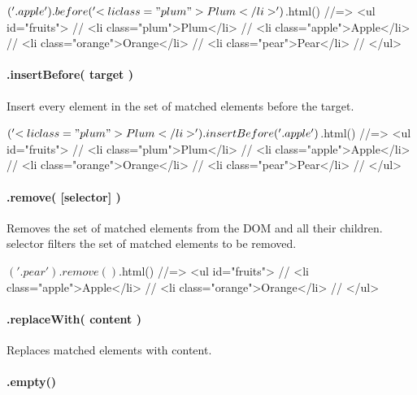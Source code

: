 \begin{DoxyCode}
$('.apple').before('<li class="plum">Plum</li>')
$.html()
//=>  <ul id="fruits">
//      <li class="plum">Plum</li>
//      <li class="apple">Apple</li>
//      <li class="orange">Orange</li>
//      <li class="pear">Pear</li>
//    </ul>
\end{DoxyCode}


\paragraph*{.insert\+Before( target )}

Insert every element in the set of matched elements before the target.


\begin{DoxyCode}
$('<li class="plum">Plum</li>').insertBefore('.apple')
$.html()
//=>  <ul id="fruits">
//      <li class="plum">Plum</li>
//      <li class="apple">Apple</li>
//      <li class="orange">Orange</li>
//      <li class="pear">Pear</li>
//    </ul>
\end{DoxyCode}


\paragraph*{.remove( \mbox{[}selector\mbox{]} )}

Removes the set of matched elements from the D\+OM and all their children. {\ttfamily selector} filters the set of matched elements to be removed.


\begin{DoxyCode}
$('.pear').remove()
$.html()
//=>  <ul id="fruits">
//      <li class="apple">Apple</li>
//      <li class="orange">Orange</li>
//    </ul>
\end{DoxyCode}


\paragraph*{.replace\+With( content )}

Replaces matched elements with {\ttfamily content}.




\paragraph*{.empty()}

